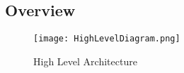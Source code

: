 \subsection{Overview}

\begin{figure}[H]
\caption{High Level Architecture}
\label{fig:HighLevel}
\centering
\texttt{[image: HighLevelDiagram.png]}
\end{figure}
